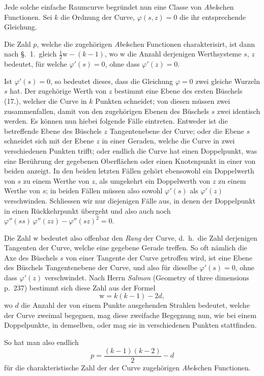 \documentclass{article}
\begin{document}
Jede solche einfache Raumcurve begründet nun eine Classe von \emph{Abel}schen Functionen. Sei $k$ die Ordnung der Curve, $\varphi(s,z)=0$ die ihr entsprechende Gleichung.


Die Zahl $p$, welche die zugehörigen \emph{Abel}schen Functionen charakterisirt, ist dann nach §.~1.\ gleich $\tfrac{1}{2}\mathrm{w}-(k-1)$, wo $\mathrm{w}$ die Anzahl derjenigen Werthsysteme $s$, $z$ bedeutet, für welche $\varphi'(s)=0$, ohne dass $\varphi'(z)=0$.

Ist $\varphi'(s)=0$, so bedeutet dieses, dass die Gleichung $\varphi=0$ zwei gleiche Wurzeln $s$ hat. Der zugehörige Werth von $z$ bestimmt eine Ebene des ersten Büschels (17.), welcher die Curve in $k$ Punkten schneidet; von diesen müssen zwei zusammenfallen, damit von den zugehörigen Ebenen des Büschels $s$ zwei identisch werden. Es können nun hiebei folgende Fälle eintreten. Entweder ist die betreffende Ebene des Büschels $z$ Tangentenebene der Curve; oder die Ebene $s$ schneidet sich mit der Ebene $z$ in einer Geraden, welche die Curve in zwei verschiedenen Punkten trifft; oder endlich die Curve hat einen Doppelpunkt, was eine Berührung der gegebenen Oberflächen oder einen Knotenpunkt in einer von beiden anzeigt. In den beiden letzten Fällen gehört ebensowohl ein Doppelwerth von $s$ zu einem Werthe von $z$, als umgekehrt ein Doppelwerth von $z$ zu einem Werthe von $s$; in beiden Fällen müssen also sowohl $\varphi'(s)$ als $\varphi'(z)$ verschwinden. Schliessen wir nur diejenigen Fälle aus, in denen der Doppelpunkt in einen Rückkehrpunkt übergeht und also auch noch $\varphi''(ss)\,\varphi''(zz)-\varphi''(sz)^{2}=0$.

Die Zahl $\mathrm{w}$ bedeutet also offenbar den \emph{Rang} der Curve, d.\ h.\ die Zahl derjenigen Tangenten der Curve, welche eine gegebene Gerade treffen. So oft nämlich die Axe des Büschels $s$ von einer Tangente der Curve getroffen wird, ist eine Ebene des Büschels Tangentenebene der Curve, und also für dieselbe $\varphi'(s)=0$, ohne dass $\varphi'(z)$ verschwindet. Nach Herrn \emph{Salmon} (Geometry of three dimensions p.\ 237) bestimmt sich diese Zahl aus der Formel
\[
\mathrm{w} = k(k-1)-2d,
\]
wo $d$ die Anzahl der von einem Punkte ausgehenden Strahlen bedeutet, welche der Curve zweimal begegnen, mag diese zweifache Begegnung nun, wie bei einem Doppelpunkte, in demselben, oder mag sie in verschiedenen Punkten stattfinden.

So hat man also endlich
\[
p = \frac{(k-1)(k-2)}{2}-d
\]
für die charakteristische Zahl der der Curve zugehörigen \emph{Abel}schen Functionen.
\end{document}
